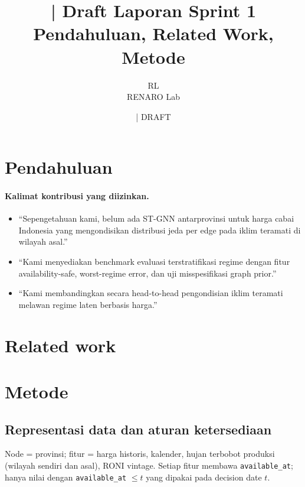 \documentclass[11pt,a4paper]{article}
\title{\jobid{RL-H4-01} | Draft Laporan Sprint 1\\
\large Pendahuluan, Related Work, Metode}
\author{RL \\ \small RENARO Lab}
\date{\todo{tanggal H4} \quad | \quad \textcolor{red!75!black}{DRAFT}}
\begin{document}
\maketitle

\section{Pendahuluan}

\paragraph{Kalimat kontribusi yang diizinkan.}
\begin{itemize}
  \item ``Sepengetahuan kami, belum ada ST-GNN antarprovinsi untuk harga cabai
        Indonesia yang mengondisikan distribusi jeda per edge pada iklim teramati
        di wilayah asal.'' 
  \item ``Kami menyediakan benchmark evaluasi terstratifikasi regime dengan fitur
        availability-safe, worst-regime error, dan uji misspesifikasi graph prior.''
  \item ``Kami membandingkan secara head-to-head pengondisian iklim teramati
        melawan regime laten berbasis harga.''
\end{itemize}

\section{Related work}

\section{Metode}
\subsection{Representasi data dan aturan ketersediaan}
Node = provinsi; fitur = harga historis, kalender, hujan terbobot produksi
(wilayah sendiri dan asal), RONI vintage. Setiap fitur membawa \texttt{available\_at};
hanya nilai dengan \texttt{available\_at} $\le t$ yang dipakai pada decision date $t$.
\end{document}
